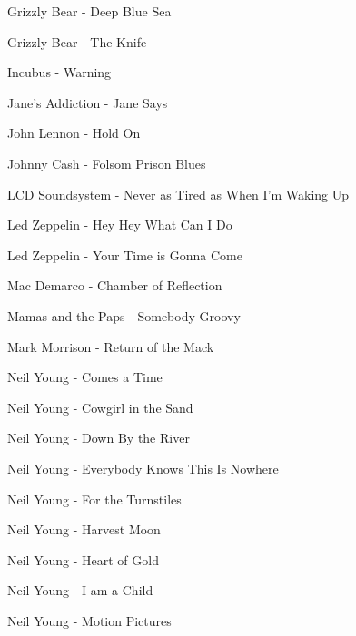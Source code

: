 Grizzly Bear - Deep Blue Sea \dotfill \pageref{Deep Blue Sea - Grizzly Bear} 

Grizzly Bear - The Knife \dotfill \pageref{The Knife - Grizzly Bear} 

Incubus - Warning \dotfill \pageref{Warning - Incubus} 

Jane's Addiction - Jane Says \dotfill \pageref{Jane Says - Jane's Addiction} 

John Lennon - Hold On \dotfill \pageref{Hold On - John Lennon} 

Johnny Cash - Folsom Prison Blues \dotfill \pageref{Folsom Prison Blues - Johnny Cash} 

LCD Soundsystem - Never as Tired as When I'm Waking Up \dotfill \pageref{Never as Tired as When I'm Waking Up - LCD Soundsystem} 

Led Zeppelin - Hey Hey What Can I Do \dotfill \pageref{Hey Hey What Can I Do - Led Zeppelin} 

Led Zeppelin - Your Time is Gonna Come \dotfill \pageref{Your Time is Gonna Come - Led Zeppelin} 

Mac Demarco - Chamber of Reflection \dotfill \pageref{Chamber of Reflection - Mac Demarco} 

Mamas and the Paps - Somebody Groovy \dotfill \pageref{Somebody Groovy - Mamas and the Paps} 

Mark Morrison - Return of the Mack \dotfill \pageref{Return of the Mack - Mark Morrison} 

Neil Young - Comes a Time \dotfill \pageref{Comes a Time - Neil Young} 

Neil Young - Cowgirl in the Sand \dotfill \pageref{Cowgirl in the Sand - Neil Young} 

Neil Young - Down By the River \dotfill \pageref{Down By the River - Neil Young} 

Neil Young - Everybody Knows This Is Nowhere \dotfill \pageref{Everybody Knows This Is Nowhere - Neil Young} 

Neil Young - For the Turnstiles \dotfill \pageref{For the Turnstiles - Neil Young} 

Neil Young - Harvest Moon \dotfill \pageref{Harvest Moon - Neil Young} 

Neil Young - Heart of Gold \dotfill \pageref{Heart of Gold - Neil Young} 

Neil Young - I am a Child \dotfill \pageref{I am a Child - Neil Young} 

Neil Young - Motion Pictures \dotfill \pageref{Motion Pictures - Neil Young} 

